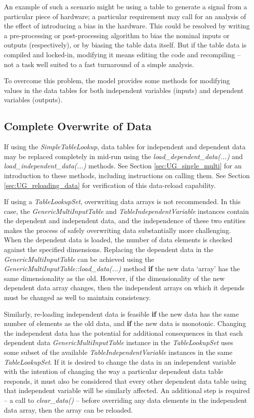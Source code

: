 \documentclass[11pt,fleqn]{report}
\begin{document}
An example of such a scenario might be using a table to generate a signal
from a particular piece of hardware; a particular requirement may call for
an analysis of the effect of introducing a bias in the hardware.
This could be resolved by writing a pre-processing or post-processing
algorithm to bias the nominal inputs or outputs (respectively), or by
biasing the table data itself.  But if the table data is compiled and
locked-in, modifying it means editing the code and recompiling -- not
a task well suited to a fast turnaround of a simple analysis.

To overcome this problem, the model provides some methods for modifying
values in the data tables for both independent variables (inputs) and
dependent variables (outputs).

\subsection {Complete Overwrite of Data}

If using the \textit{SimpleTableLookup}, data tables for independent and
dependent data may be replaced completely in mid-run using the
\textit{load\_dependent\_data(...)} and \textit{load\_independent\_data(...)}
methods. See Section \ref{sec:UG_single_multi} for an introduction to these
methods, including instructions on calling them.
See Section  \ref{sec:UG_reloading_data} for verification of this data-reload
capability.

If using a \textit{TableLookupSet}, overwriting data arrays is not recommended.
In this case, the \textit{GenericMultiInputTable} and
\textit{TableIndependentVariable} instances contain the dependent and
independent data, and the independence of these two entities makes the process
of safely overwriting data substantially more challenging.
When the dependent data is loaded, the number of data elements is checked
against the specified dimensions. Replacing the
dependent data in the \textit{GenericMultiInputTable} can be achieved using the
\textit{GenericMultiInputTable::load\_data(...)} method \textbf{if} the new data
`array' has the same dimensionality as the old. However, if the dimensionality
of the new dependent data array changes, then the independent arrays on which
it depends must be changed as well to maintain consistency.

Similarly, re-loading independent data is feasible \textbf{if} the new data has
the same number of elements as the old data, and \textbf{if} the new data is
monotonic. Changing the independent data has the potential for additional
consequences in that
each dependent data \textit{GenericMultiInputTable} instance in the
\textit{TableLookupSet} uses some subset of the available
\textit{TableIndependentVariable} instances in the same \textit{TableLookupSet}.
If it is desired to change the data in an independent variable with the
intention of changing the way a particular dependent data table responds, it
must also be considered that every other dependent data table using that
independent variable will be similarly affected. An additional step is
required -- a call to \textit{clear\_data()} -- before overriding any data
elements in the independent data array, then the array can be reloaded.
\end{document}
